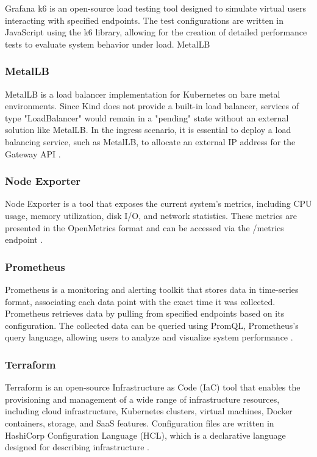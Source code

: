Grafana k6 is an open-source load testing tool designed to simulate virtual users interacting with specified endpoints. The test configurations are written in JavaScript using the k6 library, allowing for the creation of detailed performance tests to evaluate system behavior under load.
MetalLB

\subsubsection{MetalLB}
\label{sec:metallb}

MetalLB is a load balancer implementation for Kubernetes on bare metal environments. Since Kind does not provide a built-in load balancer, services of type "LoadBalancer" would remain in a "pending" state without an external solution like MetalLB. In the ingress scenario, it is essential to deploy a load balancing service, such as MetalLB, to allocate an external IP address for the Gateway API \cite{MetalLB}.

\subsubsection{Node Exporter}
\label{sec:nodeExporter}

Node Exporter is a tool that exposes the current system's metrics, including CPU usage, memory utilization, disk I/O, and network statistics. These metrics are presented in the OpenMetrics format and can be accessed via the /metrics endpoint \cite{NodeExporter}.

\subsubsection{Prometheus}
\label{sec:prometheus}

Prometheus is a monitoring and alerting toolkit that stores data in time-series format, associating each data point with the exact time it was collected. Prometheus retrieves data by pulling from specified endpoints based on its configuration. The collected data can be queried using PromQL, Prometheus's query language, allowing users to analyze and visualize system performance \cite{Prometheus}.

\subsubsection{Terraform}
\label{sec:terraform}

Terraform is an open-source Infrastructure as Code (IaC) tool that enables the provisioning and management of a wide range of infrastructure resources, including cloud infrastructure, Kubernetes clusters, virtual machines, Docker containers, storage, and SaaS features. Configuration files are written in HashiCorp Configuration Language (HCL), which is a declarative language designed for describing infrastructure \cite{Terraform}.

